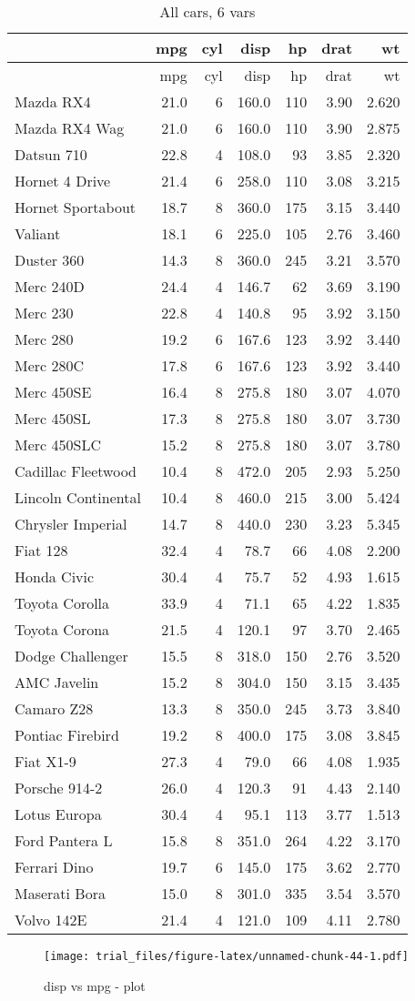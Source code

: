 \documentclass[]{article}
\begin{document}
\begin{longtable}[]{@{}lrrrrrr@{}}
\caption{All cars, 6 vars}\tabularnewline
\toprule
& mpg & cyl & disp & hp & drat & wt\tabularnewline
\midrule
\endfirsthead
\toprule
& mpg & cyl & disp & hp & drat & wt\tabularnewline
\midrule
\endhead
Mazda RX4 & 21.0 & 6 & 160.0 & 110 & 3.90 & 2.620\tabularnewline
Mazda RX4 Wag & 21.0 & 6 & 160.0 & 110 & 3.90 & 2.875\tabularnewline
Datsun 710 & 22.8 & 4 & 108.0 & 93 & 3.85 & 2.320\tabularnewline
Hornet 4 Drive & 21.4 & 6 & 258.0 & 110 & 3.08 & 3.215\tabularnewline
Hornet Sportabout & 18.7 & 8 & 360.0 & 175 & 3.15 & 3.440\tabularnewline
Valiant & 18.1 & 6 & 225.0 & 105 & 2.76 & 3.460\tabularnewline
Duster 360 & 14.3 & 8 & 360.0 & 245 & 3.21 & 3.570\tabularnewline
Merc 240D & 24.4 & 4 & 146.7 & 62 & 3.69 & 3.190\tabularnewline
Merc 230 & 22.8 & 4 & 140.8 & 95 & 3.92 & 3.150\tabularnewline
Merc 280 & 19.2 & 6 & 167.6 & 123 & 3.92 & 3.440\tabularnewline
Merc 280C & 17.8 & 6 & 167.6 & 123 & 3.92 & 3.440\tabularnewline
Merc 450SE & 16.4 & 8 & 275.8 & 180 & 3.07 & 4.070\tabularnewline
Merc 450SL & 17.3 & 8 & 275.8 & 180 & 3.07 & 3.730\tabularnewline
Merc 450SLC & 15.2 & 8 & 275.8 & 180 & 3.07 & 3.780\tabularnewline
Cadillac Fleetwood & 10.4 & 8 & 472.0 & 205 & 2.93 &
5.250\tabularnewline
Lincoln Continental & 10.4 & 8 & 460.0 & 215 & 3.00 &
5.424\tabularnewline
Chrysler Imperial & 14.7 & 8 & 440.0 & 230 & 3.23 & 5.345\tabularnewline
Fiat 128 & 32.4 & 4 & 78.7 & 66 & 4.08 & 2.200\tabularnewline
Honda Civic & 30.4 & 4 & 75.7 & 52 & 4.93 & 1.615\tabularnewline
Toyota Corolla & 33.9 & 4 & 71.1 & 65 & 4.22 & 1.835\tabularnewline
Toyota Corona & 21.5 & 4 & 120.1 & 97 & 3.70 & 2.465\tabularnewline
Dodge Challenger & 15.5 & 8 & 318.0 & 150 & 2.76 & 3.520\tabularnewline
AMC Javelin & 15.2 & 8 & 304.0 & 150 & 3.15 & 3.435\tabularnewline
Camaro Z28 & 13.3 & 8 & 350.0 & 245 & 3.73 & 3.840\tabularnewline
Pontiac Firebird & 19.2 & 8 & 400.0 & 175 & 3.08 & 3.845\tabularnewline
Fiat X1-9 & 27.3 & 4 & 79.0 & 66 & 4.08 & 1.935\tabularnewline
Porsche 914-2 & 26.0 & 4 & 120.3 & 91 & 4.43 & 2.140\tabularnewline
Lotus Europa & 30.4 & 4 & 95.1 & 113 & 3.77 & 1.513\tabularnewline
Ford Pantera L & 15.8 & 8 & 351.0 & 264 & 4.22 & 3.170\tabularnewline
Ferrari Dino & 19.7 & 6 & 145.0 & 175 & 3.62 & 2.770\tabularnewline
Maserati Bora & 15.0 & 8 & 301.0 & 335 & 3.54 & 3.570\tabularnewline
Volvo 142E & 21.4 & 4 & 121.0 & 109 & 4.11 & 2.780\tabularnewline
\bottomrule
\end{longtable}

\begin{figure}[htbp]
\centering
\texttt{[image: trial\_files/figure-latex/unnamed-chunk-44-1.pdf]}
\caption{disp vs mpg - plot}
\end{figure}
\end{document}
